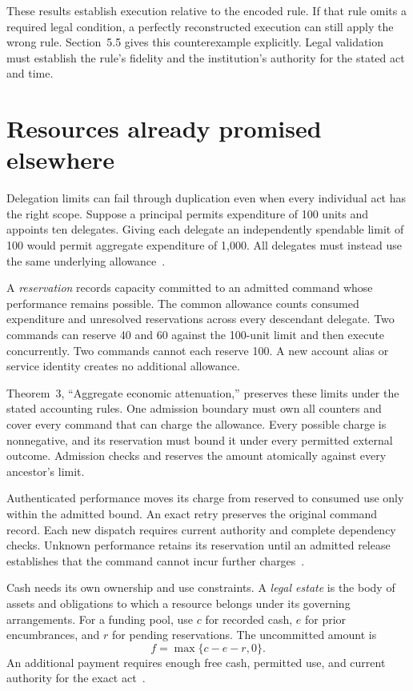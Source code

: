 \documentclass{momentum}
\begin{document}
These results establish execution relative to the encoded rule.
If that rule omits a required legal condition, a perfectly reconstructed execution can still apply the wrong rule.
Section~5.5 gives this counterexample explicitly.
Legal validation must establish the rule's fidelity and the institution's authority for the stated act and time.

\section{Resources already promised elsewhere}
\label{sec:resources}

Delegation limits can fail through duplication even when every individual act has the right scope.
Suppose a principal permits expenditure of 100 units and appoints ten delegates.
Giving each delegate an independently spendable limit of 100 would permit aggregate expenditure of 1,000.
All delegates must instead use the same underlying allowance~\cite[Section~7.5]{institutions}.

A \emph{reservation} records capacity committed to an admitted command whose performance remains possible.
The common allowance counts consumed expenditure and unresolved reservations across every descendant delegate.
Two commands can reserve 40 and 60 against the 100-unit limit and then execute concurrently.
Two commands cannot each reserve 100.
A new account alias or service identity creates no additional allowance.

Theorem~3, ``Aggregate economic attenuation,'' preserves these limits under the stated accounting rules.
One admission boundary must own all counters and cover every command that can charge the allowance.
Every possible charge is nonnegative, and its reservation must bound it under every permitted external outcome.
Admission checks and reserves the amount atomically against every ancestor's limit.

Authenticated performance moves its charge from reserved to consumed use only within the admitted bound.
An exact retry preserves the original command record.
Each new dispatch requires current authority and complete dependency checks.
Unknown performance retains its reservation until an admitted release establishes that the command cannot incur further charges~\cite[Section~7.5]{institutions}.

Cash needs its own ownership and use constraints.
A \emph{legal estate} is the body of assets and obligations to which a resource belongs under its governing arrangements.
For a funding pool, use \(c\) for recorded cash, \(e\) for prior encumbrances, and \(r\) for pending reservations.
The uncommitted amount is
\[
f=\max\{c-e-r,0\}.
\]
An additional payment requires enough free cash, permitted use, and current authority for the exact act~\cite[Section~2, ``Estate-specific funding'']{entity}.
\end{document}
